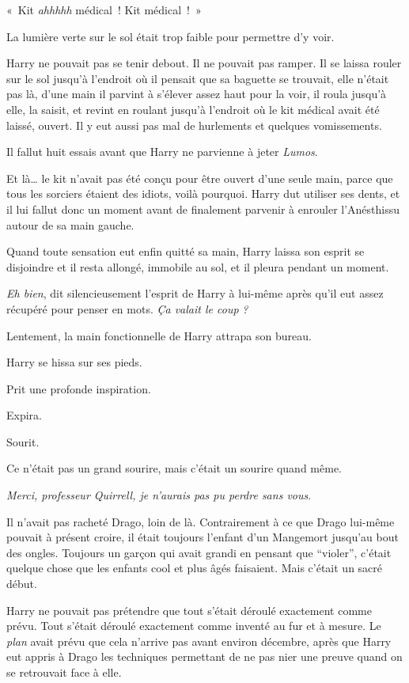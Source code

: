 «~Kit \emph{ahhhhh} médical~!
Kit médical~!~»

La lumière verte sur le sol était trop faible pour permettre d'y voir.

Harry ne pouvait pas se tenir debout.
Il ne pouvait pas ramper.
Il se laissa rouler sur le sol jusqu'à l'endroit où il pensait que sa baguette se trouvait, elle n'était pas là, d'une main il parvint à s'élever assez haut pour la voir, il roula jusqu'à elle, la saisit, et revint en roulant jusqu'à l'endroit où le kit médical avait été laissé, ouvert.
Il y eut aussi pas mal de hurlements et quelques vomissements.

Il fallut huit essais avant que Harry ne parvienne à jeter \emph{Lumos}.

Et là… le kit n'avait pas été conçu pour être ouvert d'une seule main, parce que tous les sorciers étaient des idiots, voilà pourquoi.
Harry dut utiliser ses dents, et il lui fallut donc un moment avant de finalement parvenir à enrouler l'Anésthissu autour de sa main gauche.

Quand toute sensation eut enfin quitté sa main, Harry laissa son esprit se disjoindre et il resta allongé, immobile au sol, et il pleura pendant un moment.

\emph{Eh bien}, dit silencieusement l'esprit de Harry à lui-même après qu'il eut assez récupéré pour penser en mots.
\emph{Ça valait le coup} \emph{?}

Lentement, la main fonctionnelle de Harry attrapa son bureau.

Harry se hissa sur ses pieds.

Prit une profonde inspiration.

Expira.

Sourit.

Ce n'était pas un grand sourire, mais c'était un sourire quand même.

\emph{Merci, professeur Quirrell, je n'aurais pas pu perdre sans vous}.

Il n'avait pas racheté Drago, loin de là.
Contrairement à ce que Drago lui-même pouvait à présent croire, il était toujours l'enfant d'un Mangemort jusqu'au bout des ongles.
Toujours un garçon qui avait grandi en pensant que “violer”, c'était quelque chose que les enfants cool et plus âgés faisaient.
Mais c'était un sacré début.

Harry ne pouvait pas prétendre que tout s'était déroulé exactement comme prévu.
Tout s'était déroulé exactement comme inventé au fur et à mesure.
Le \emph{plan} avait prévu que cela n'arrive pas avant environ décembre, après que Harry eut appris à Drago les techniques permettant de ne pas nier une preuve quand on se retrouvait face à elle.

